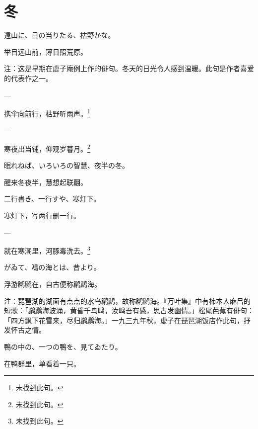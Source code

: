 \section{\FK 冬}

\setcounter{haikucounter}{0}

\begin{haiku}
    {\FH 遠山に、日の当りたる、枯野かな。}

    {\FK 举目远山前，薄日照荒原。}

    {\FT 注：这是早期在虚子庵例上作的俳句。冬天的日光令人感到温暖。此句是作者喜爱的代表作之一。}
\end{haiku}

\begin{haiku}
    {\FH ---}

    {\FK 携伞向前行，枯野听雨声。\footnote{\FT 未找到此句。}}
\end{haiku}

\begin{haiku}
    {\FH ---}

    {\FK 寒夜出当铺，仰观岁暮月。\footnote{\FT 未找到此句。}}
\end{haiku}

\begin{haiku}
    {\FH 眠れねば、いろいろの智慧、夜半の冬。}

    {\FK 醒来冬夜半，慧想起联翩。}
\end{haiku}

\begin{haiku}
    {\FH 二行書き、一行すや、寒灯下。}

    {\FK 寒灯下，写两行删一行。}
\end{haiku}

\begin{haiku}
    {\FH ---}

    {\FK 就在寒潮里，河豚毒洗去。\footnote{\FT 未找到此句。}}
\end{haiku}

\begin{haiku}
    {\FH {}がゐて、鳰の海とは、昔より。}

    {\FK 浮游䴙䴘在，自古便称䴙䴘海。}

    {\FT 注：琵琶湖的湖面有点点的水鸟䴙䴘，故称䴙䴘海。『万叶集』中有柿本人麻吕的短歌：「䴙䴘海波涌，黄昏千鸟鸣，汝鸣吾有感，思古发幽情。」松尾芭蕉有俳句：「四方飘下花雪来，尽归䴙䴘海。」一九三九年秋，虚子在琵琶湖饭店作此句，抒发怀古之情。}
\end{haiku}

\begin{haiku}
    {\FH 鴨の中の、一つの鴨を、見てゐたり。}

    {\FK 在鸭群里，单看着一只。}
\end{haiku}

